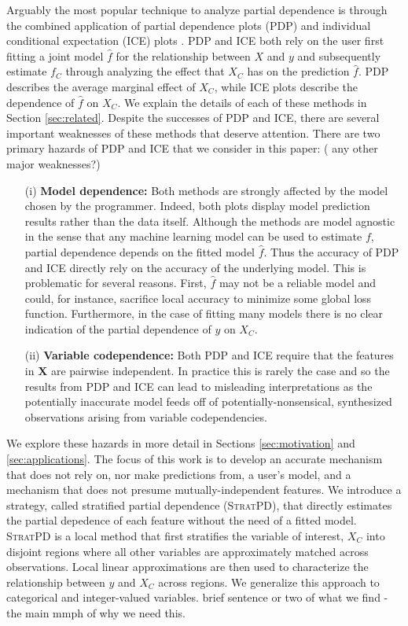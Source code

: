 \documentclass[12pt]{article}
\newcommand{\spd}{\fontfamily{cmr}\textsc{\small StratPD}}
\begin{document}
Arguably the most popular technique to analyze partial dependence is through the combined application of partial dependence plots (PDP) \citep{PDP} and individual conditional expectation (ICE) plots \citep{ICE}. PDP and ICE both rely on the user first fitting a joint model $\widehat{f}$ for the relationship between $X$ and $y$ and subsequently estimate $f_C$ through analyzing the effect that $X_C$ has on the prediction $\widehat{f}$. PDP describes the average marginal effect of $X_C$, while ICE plots describe the dependence of $\widehat{f}$ on $X_C$. We explain the details of each of these methods in Section \ref{sec:related}. Despite the successes of PDP and ICE, there are several important weaknesses of these methods that deserve attention. There are two primary hazards of PDP and ICE that we consider in this paper: ({\color{red} any other major weaknesses?})
\begin{itemize}
	\item[(i)] {\bf Model dependence:} Both methods are strongly affected by the model chosen by the programmer. Indeed, both plots display model prediction results rather than the data itself. Although the methods are model agnostic in the sense that any machine learning model can be used to estimate $f$, partial dependence depends on the fitted model $\widehat{f}$. Thus the accuracy of PDP and ICE directly rely on the accuracy of the underlying model. This is problematic for several reasons. First, $\widehat{f}$ may not be a reliable model and could, for instance, sacrifice local accuracy to minimize some global loss function. Furthermore, in the case of fitting many models there is no clear indication of the partial dependence of $y$ on $X_C$.
	\item[(ii)] {\bf Variable codependence:} Both PDP and ICE require that the features in $\mathbf{X}$ are pairwise independent. In practice this is rarely the case and so the results from PDP and ICE can lead to misleading interpretations as the potentially inaccurate model feeds off of potentially-nonsensical, synthesized observations arising from variable codependencies.  
\end{itemize}
We explore these hazards in more detail in Sections \ref{sec:motivation} and \ref{sec:applications}. The focus of this work is to develop an accurate mechanism that does not rely on, nor make predictions from, a user's model, and a mechanism that does not presume mutually-independent features. We introduce a strategy, called stratified partial dependence (\spd{}), that directly estimates the partial depedence of each feature without the need of a fitted model. \spd{} is a local method that first stratifies the variable of interest, ${X}_C$ into disjoint regions where all other variables are approximately matched across observations. Local linear approximations are then used to characterize the relationship between $y$ and $X_C$ across regions. We generalize this approach to categorical and integer-valued variables. {\color{red} brief sentence or two of what we find - the main mmph of why we need this.}
\end{document}
